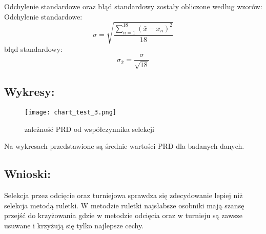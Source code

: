   \newline
    Odchylenie standardowe oraz błąd standardowy zostały obliczone według wzorów: \\
    Odchylenie standardowe:
    \[ \sigma = \sqrt{\frac{\sum_{n = 1}^{18}(\bar{x} - x_n)^2}{18}} \]
    błąd standardowy:
    \[ \sigma_{\bar{x}} = \frac{\sigma}{\sqrt{18}} \]

  \subsection{Wykresy: }
    \begin{figure}[H]
      \texttt{[image: chart\_test\_3.png]}
      \centering
      \caption{zależność PRD od współczynnika selekcji}
    \end{figure}
  
    Na wykresach przedstawione są średnie wartości PRD dla badanych danych.
  \subsection{Wnioski: }
  Selekcja przez odcięcie oraz turniejowa sprawdza się zdecydowanie lepiej niż selekcja metodą ruletki. W metodzie ruletki najsłabsze osobniki mają szansę przejść do krzyżowania gdzie w metodzie odcięcia oraz w turnieju są zawsze usuwane i krzyżują się tylko najlepsze cechy.
